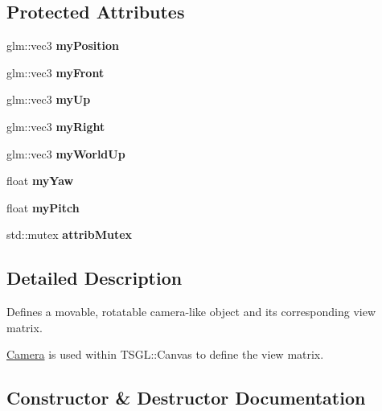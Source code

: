 \subsection*{Protected Attributes}
\begin{DoxyCompactItemize}
\item 
\mbox{\label{classtsgl_1_1_camera_ac8e69c5f97e19905b09b01c0bf876274}} 
glm\+::vec3 {\bfseries my\+Position}
\item 
\mbox{\label{classtsgl_1_1_camera_a04dcfb1e8061ac4cf4b4ebb79ba1b5b0}} 
glm\+::vec3 {\bfseries my\+Front}
\item 
\mbox{\label{classtsgl_1_1_camera_a433e056f81c1b6488fed8fb314e2ea84}} 
glm\+::vec3 {\bfseries my\+Up}
\item 
\mbox{\label{classtsgl_1_1_camera_aaf772a056a8c2e64056583158b472a38}} 
glm\+::vec3 {\bfseries my\+Right}
\item 
\mbox{\label{classtsgl_1_1_camera_a7da972a788e67ccbddb210aaafa05584}} 
glm\+::vec3 {\bfseries my\+World\+Up}
\item 
\mbox{\label{classtsgl_1_1_camera_adf4f3c5959cda3bb47e7f20fcaca19a5}} 
float {\bfseries my\+Yaw}
\item 
\mbox{\label{classtsgl_1_1_camera_a037f7d3e8d5ddefe92e2d221fd585432}} 
float {\bfseries my\+Pitch}
\item 
\mbox{\label{classtsgl_1_1_camera_aa1b04e1f336367fed432b50a2539f4e5}} 
std\+::mutex {\bfseries attrib\+Mutex}
\end{DoxyCompactItemize}


\subsection{Detailed Description}
Defines a movable, rotatable camera-\/like object and its corresponding view matrix. 

\hyperlink{classtsgl_1_1_camera}{Camera} is used within T\+S\+G\+L\+::\+Canvas to define the view matrix. 

\subsection{Constructor \& Destructor Documentation}
\mbox{\label{classtsgl_1_1_camera_ad55c777a783afe64666b22c4867a2ac0}} 
